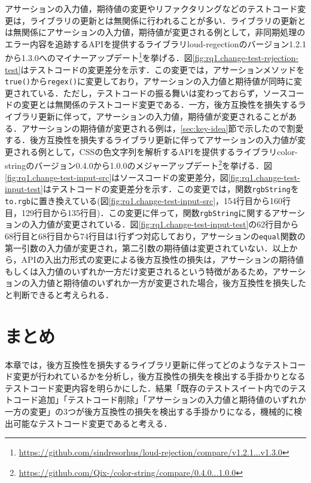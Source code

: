 \documentclass[11pt,dvipdfmx]{jreport}
\begin{document}
アサーションの入力値，期待値の変更やリファクタリングなどのテストコード変更は，ライブラリの更新とは無関係に行われることが多い．ライブラリの更新とは無関係にアサーションの入力値，期待値が変更される例として，非同期処理のエラー内容を追跡するAPIを提供するライブラリloud-regectionのバージョン1.2.1から1.3.0へのマイナーアップデート\footnote{\url{https://github.com/sindresorhus/loud-rejection/compare/v1.2.1...v1.3.0}}を挙げる．図\ref{fig:rq1.change-test-rejection-test}はテストコードの変更差分を示す．この変更では，アサーションメソッドを{\verb|true()|}から{\verb|regex()|}に変更しており，アサーションの入力値と期待値が同時に変更されている．ただし，テストコードの振る舞いは変わっておらず，ソースコードの変更とは無関係のテストコード変更である．一方，後方互換性を損失するライブラリ更新に伴って，アサーションの入力値，期待値が変更されることがある．アサーションの期待値が変更される例は，\ref{sec:key-idea}節で示したので割愛する．後方互換性を損失するライブラリ更新に伴ってアサーションの入力値が変更される例として，CSSの色文字列を解析するAPIを提供するライブラリcolor-stringのバージョン0.4.0から1.0.0のメジャーアップデート\footnote{\url{https://github.com/Qix-/color-string/compare/0.4.0...1.0.0}}を挙げる．図\ref{fig:rq1.change-test-input-src}はソースコードの変更差分，図\ref{fig:rq1.change-test-input-test}はテストコードの変更差分を示す．この変更では，関数{\verb|rgbString|}を{\verb|to.rgb|}に置き換えている(図\ref{fig:rq1.change-test-input-src}，154行目から160行目，129行目から135行目)．この変更に伴って，関数{\verb|rgbString|}に関するアサーションの入力値が変更されている．図\ref{fig:rq1.change-test-input-test}の62行目から68行目と68行目から74行目は1行ずつ対応しており，アサーションの{\verb|equal|}関数の第一引数の入力値が変更され，第二引数の期待値は変更されていない．以上から，APIの入出力形式の変更による後方互換性の損失は，アサーションの期待値もしくは入力値のいずれか一方だけ変更されるという特徴があるため，アサーションの入力値と期待値のいずれか一方が変更された場合，後方互換性を損失したと判断できると考えられる．


\section{まとめ}
本章では，後方互換性を損失するライブラリ更新に伴ってどのようなテストコード変更が行われているかを分析し，後方互換性の損失を検出する手掛かりとなるテストコード変更内容を明らかにした．結果「既存のテストスイート内でのテストコード追加」「テストコード削除」「アサーションの入力値と期待値のいずれか一方の変更」の3つが後方互換性の損失を検出する手掛かりになる，機械的に検出可能なテストコード変更であると考える．
\end{document}
